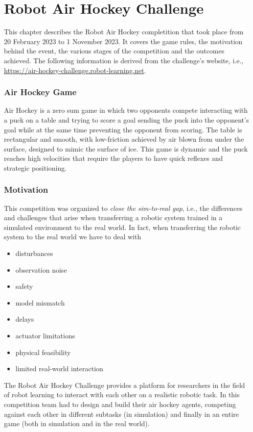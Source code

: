 \chapter{Robot Air Hockey Challenge}
\label{ch:robot_air_hockey_challenge}
This chapter describes the Robot Air Hockey completition that took place from 20 February 2023 to 1 November 2023.
It covers the game rules, the motivation behind the event, the various stages of the competition and the outcomes achieved.
The following information is derived from the challenge's website, i.e., \url{https://air-hockey-challenge.robot-learning.net}.

\subsection{Air Hockey Game}
Air Hockey is a zero sum game in which two opponents compete interacting with a puck on a table and trying to score a goal
sending the puck into the opponent's goal while at the same time preventing the opponent from scoring.
The table is rectangular and smooth, with low-friction achieved by air blown from under the surface, designed to mimic the surface of ice.
This game is dynamic and the puck reaches high velocities that require the players to have quick reflexes and strategic positioning.


\subsection{Motivation}
This competition was organized to \textit{close the sim-to-real gap}, i.e., the differences and challenges that arise
when transferring a robotic system trained in a simulated environment to the real world.
In fact, when transferring the robotic system to the real world we have to deal with
\begin{itemize}
    \item disturbances
    \item observation noise
    \item safety
    \item model mismatch
    \item delays
    \item actuator limitations
    \item physical feasibility
    \item limited real-world interaction
\end{itemize}

The Robot Air Hockey Challenge provides a platform for researchers in the field of robot learning to interact with each
other on a realistic robotic task. In this competition team had to design and build their air hockey agents, competing against
each other in different subtasks (in simulation) and finally in an entire game (both in simulation and in the real world).



